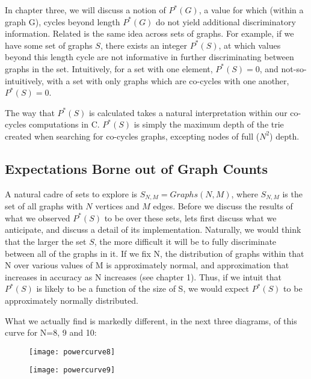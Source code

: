 In chapter three, we will discuss a notion of $P^*(G)$, a value for which (within a graph G), cycles beyond length $P^*(G)$ do not yield additional discriminatory information.
Related is the same idea across sets of graphs.
For example, if we have some set of graphs $S$, there exists an integer $P^*(S)$, at which values beyond this length cycle are not informative in further discriminating between graphs in the set.
Intuitively, for a set with one element, $P^*(S) = 0$, and not-so-intuitively, with a set with only graphs which are co-cycles with one another, $P^*(S) = 0$.

The way that  $P^*(S)$ is calculated takes a natural interpretation within our co-cycles computations in C. 
 $P^*(S)$ is simply the maximum depth of the trie created when searching for co-cycles graphs, excepting nodes of full ($N^2$) depth.

\subsection{Expectations Borne out of Graph Counts}

A natural cadre of sets to explore is $S_{N, M} = Graphs(N, M)$, where $S_{N, M}$ is the set of all graphs with $N$ vertices and $M$ edges.
Before we discuss the results of what we observed $P^*(S)$ to be over these sets, lets first discuss what we anticipate, and discuss a detail of its implementation.
Naturally, we would think that the larger the set $S$, the more difficult it will be to fully discriminate between all of the graphs in it.
If we fix N, the distribution of graphs within that N over various values of M is approximately normal, and approximation that increases in accuracy as N increases (see chapter 1).
Thus, if we intuit that $P^*(S)$ is likely to be a function of the size of S, we would expect $P^*(S)$ to be approximately normally distributed.

What we actually find is markedly different, in the next three diagrams, of this curve for N=8, 9 and 10:

\begin{figure}[h]
\label{fig:powercurve8}
\caption{}
\centering
\texttt{[image: powercurve8]}
\end{figure}

\begin{figure}[h]
\label{fig:powercurve9}
\caption{}
\centering
\texttt{[image: powercurve9]}
\end{figure}

